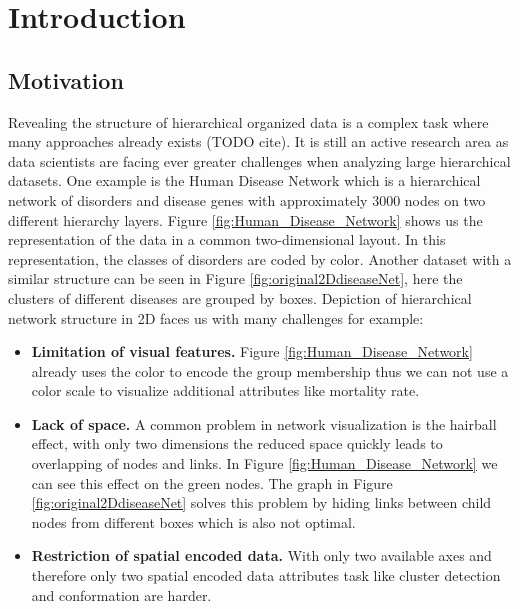\chapter{Introduction}

\section{Motivation}
Revealing the structure of hierarchical organized data is a complex task where many approaches already exists (TODO cite). It is still an active research area as data scientists are facing ever greater challenges when analyzing large hierarchical datasets. One example is the Human Disease Network \cite{zhou_human_2014} which is a hierarchical network of disorders and disease genes with approximately 3000 nodes on two different hierarchy layers. Figure \ref{fig:Human_Disease_Network} shows us the representation of the data in a common two-dimensional layout. In this representation, the classes of disorders are coded by color. 
Another dataset with a similar structure can be seen in Figure \ref{fig:original2DdiseaseNet}, here the clusters of different diseases are grouped by boxes. Depiction of hierarchical network structure in 2D faces us with many challenges for example: 
\begin{itemize}
    \item \textbf{Limitation of visual features.} Figure \ref{fig:Human_Disease_Network} already uses the color to encode the group membership thus we can not use a color scale to visualize additional attributes like mortality rate.
    \item \textbf{Lack of space.} A common problem in network visualization is the hairball effect, with only two dimensions the reduced space quickly leads to overlapping of nodes and links. In Figure \ref{fig:Human_Disease_Network} we can see this effect on the green nodes. The graph in Figure \ref{fig:original2DdiseaseNet} solves this problem by hiding links between child nodes from different boxes which is also not optimal.
    \item \textbf{Restriction of spatial encoded data.} With only two available axes and therefore only two spatial encoded data attributes task like cluster detection and conformation are harder.
\end{itemize} 

